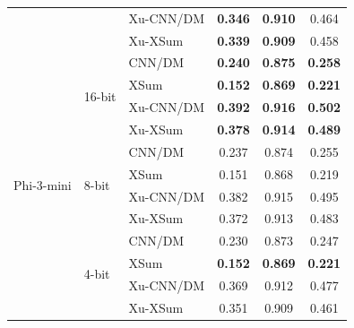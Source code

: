 \begin{table}[tbp]
\begin{tabular}{lllccc}
 &  & Xu-CNN/DM & \textbf{0.346} & \textbf{0.910} & 0.464 \\
 &  & Xu-XSum & \textbf{0.339} & \textbf{0.909} & 0.458 \\
\midrule
\multirow{12}{*}{Phi-3-mini} & \multirow{4}{*}{16-bit} & CNN/DM & \textbf{0.240} & \textbf{0.875} & \textbf{0.258} \\
 &  & XSum & \textbf{0.152} & \textbf{0.869} & \textbf{0.221} \\
 &  & Xu-CNN/DM & \textbf{0.392} & \textbf{0.916} & \textbf{0.502} \\
 &  & Xu-XSum & \textbf{0.378} & \textbf{0.914} & \textbf{0.489} \\
\cmidrule(lr){2-6}
 & \multirow{4}{*}{8-bit} & CNN/DM & 0.237 & 0.874 & 0.255 \\
 &  & XSum & 0.151 & 0.868 & 0.219 \\
 &  & Xu-CNN/DM & 0.382 & 0.915 & 0.495 \\
 &  & Xu-XSum & 0.372 & 0.913 & 0.483 \\
\cmidrule(lr){2-6}
 & \multirow{4}{*}{4-bit} & CNN/DM & 0.230 & 0.873 & 0.247 \\
 &  & XSum & \textbf{0.152} & \textbf{0.869} & \textbf{0.221} \\
 &  & Xu-CNN/DM & 0.369 & 0.912 & 0.477 \\
 &  & Xu-XSum & 0.351 & 0.909 & 0.461 \\
\bottomrule
\end{tabular}
\end{table}

